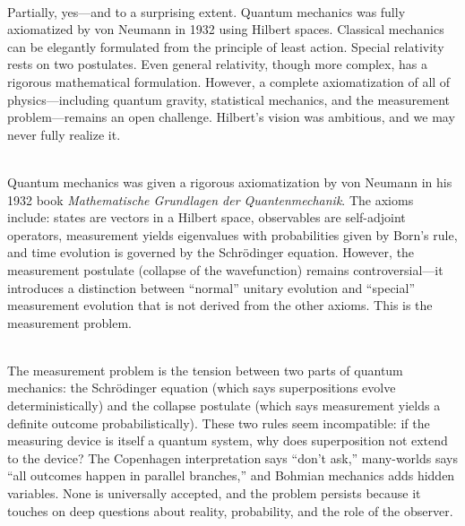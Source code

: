 \begin{description}[font=\bfseries, leftmargin=2em, style=nextline]

\item[Q: Can physics really be axiomatized like geometry?]\hfill\\
Partially, yes---and to a surprising extent. Quantum mechanics was fully axiomatized by von Neumann in 1932 using Hilbert spaces. Classical mechanics can be elegantly formulated from the principle of least action. Special relativity rests on two postulates. Even general relativity, though more complex, has a rigorous mathematical formulation. However, a complete axiomatization of all of physics---including quantum gravity, statistical mechanics, and the measurement problem---remains an open challenge. Hilbert's vision was ambitious, and we may never fully realize it.

\item[Q: Does quantum mechanics have a complete set of axioms?]\hfill\\
Quantum mechanics was given a rigorous axiomatization by von Neumann in his 1932 book \textit{Mathematische Grundlagen der Quantenmechanik}. The axioms include: states are vectors in a Hilbert space, observables are self-adjoint operators, measurement yields eigenvalues with probabilities given by Born's rule, and time evolution is governed by the Schr\"odinger equation. However, the measurement postulate (collapse of the wavefunction) remains controversial---it introduces a distinction between ``normal'' unitary evolution and ``special'' measurement evolution that is not derived from the other axioms. This is the measurement problem.

\item[Q: Why is the measurement problem still a problem?]\hfill\\
The measurement problem is the tension between two parts of quantum mechanics: the Schr\"odinger equation (which says superpositions evolve deterministically) and the collapse postulate (which says measurement yields a definite outcome probabilistically). These two rules seem incompatible: if the measuring device is itself a quantum system, why does superposition not extend to the device? The Copenhagen interpretation says ``don't ask,'' many-worlds says ``all outcomes happen in parallel branches,'' and Bohmian mechanics adds hidden variables. None is universally accepted, and the problem persists because it touches on deep questions about reality, probability, and the role of the observer.


\end{description}
